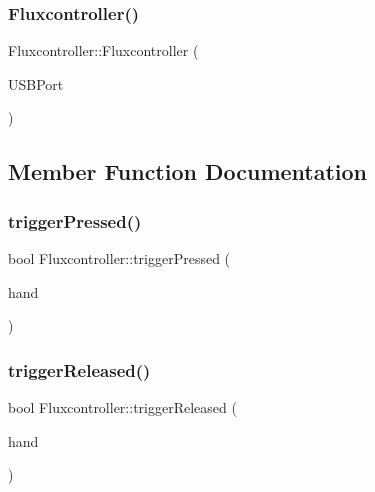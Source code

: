 \subsubsection{\texorpdfstring{Fluxcontroller()}{Fluxcontroller()}}
{\footnotesize\ttfamily Fluxcontroller\+::\+Fluxcontroller (\begin{DoxyParamCaption}\item[{unsigned int}]{U\+S\+B\+Port }\end{DoxyParamCaption})}



\subsection{Member Function Documentation}
\mbox{\label{classFluxcontroller_a4d561daf0111359a6a1361be49cdf7dd}} 
\subsubsection{\texorpdfstring{trigger\+Pressed()}{triggerPressed()}}
{\footnotesize\ttfamily bool Fluxcontroller\+::trigger\+Pressed (\begin{DoxyParamCaption}\item[{\hyperlink{FluxController_8h_a899b1f99e0792573e6e4b51d84f78653}{H\+A\+ND}}]{hand }\end{DoxyParamCaption})}

\mbox{\label{classFluxcontroller_a67883b472160e2b316ba96685cecd925}} 
\subsubsection{\texorpdfstring{trigger\+Released()}{triggerReleased()}}
{\footnotesize\ttfamily bool Fluxcontroller\+::trigger\+Released (\begin{DoxyParamCaption}\item[{\hyperlink{FluxController_8h_a899b1f99e0792573e6e4b51d84f78653}{H\+A\+ND}}]{hand }\end{DoxyParamCaption})}

\mbox{\label{classFluxcontroller_a70817ff24cbaf6029c69e5213b0bae90}} 
